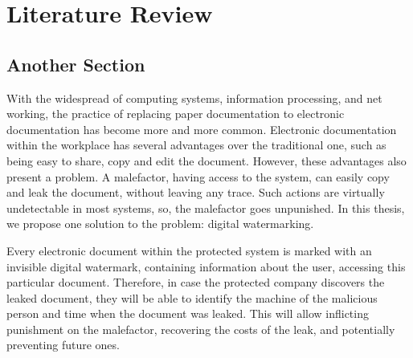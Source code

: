 \chapter{Literature Review}
\label{chap:lr}


\Blindtext[2]

\section{Another Section}
\Blindtext[1]
\newpage
With the widespread of computing systems, information processing, and net working, the practice of replacing paper documentation to electronic documentation has become more and more common. Electronic documentation within the workplace has several advantages over the traditional one, such as being easy to share, copy and edit the document. However, these advantages also present a problem. A malefactor, having access to the system, can easily copy and leak the document, without leaving any trace. Such actions are virtually undetectable in most systems, so, the malefactor goes unpunished. In this thesis, we propose one solution to the problem: digital watermarking. 

Every electronic document within the protected system is marked with an invisible digital watermark, containing information about the user, accessing this particular document. Therefore, in case the protected company discovers the leaked document, they will be able to identify the machine of the malicious person and time when the document was leaked. This will allow inflicting punishment on the malefactor, recovering the costs of the leak, and potentially preventing future ones. 

